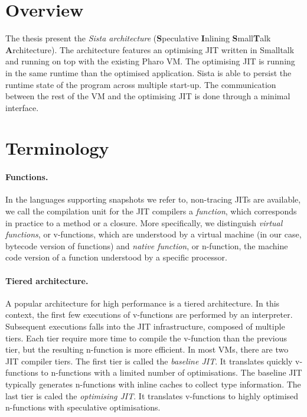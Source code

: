 \documentclass[a4paper,12pt,twoside]{../includes/ThesisStyle}
\begin{document}
\section{Overview}

The thesis present the \emph{Sista architecture} (\textbf{S}peculative \textbf{I}nlining \textbf{S}mall\textbf{T}alk \textbf{A}rchitecture). The architecture features an optimising JIT written in Smalltalk and running on top with the existing Pharo VM. The optimising JIT is running in the same runtime than the optimised application. Sista is able to persist the runtime state of the program across multiple start-up. The communication between the rest of the VM and the optimising JIT is done through a minimal interface.

\section{Terminology}

\paragraph{Functions.} In the languages supporting snapshots we refer to, non-tracing JITs are available, we call the compilation unit for the JIT compilers a \emph{function}, which corresponds in practice to a method or a closure. More specifically, we distinguish \emph{virtual functions}, or v-functions, which are understood by a virtual machine (in our case, bytecode version of functions) and \emph{native function}, or n-function, the machine code version of a function understood by a specific processor.

\paragraph{Tiered architecture.} A popular architecture for high performance is a tiered architecture. In this context, the first few executions of v-functions are performed by an interpreter. Subsequent executions falls into the JIT infrastructure, composed of multiple tiers. Each tier require more time to compile the v-function than the previous tier, but the resulting n-function is more efficient. In most VMs, there are two JIT compiler tiers. The first tier is called the \emph{baseline JIT}. It translates quickly v-functions to n-functions with a limited number of optimisations. The baseline JIT typically generates n-functions with inline caches to collect type information. The last tier is caled the \emph{optimising JIT}. It translates v-functions to highly optimised n-functions with speculative optimisations.
\end{document}
